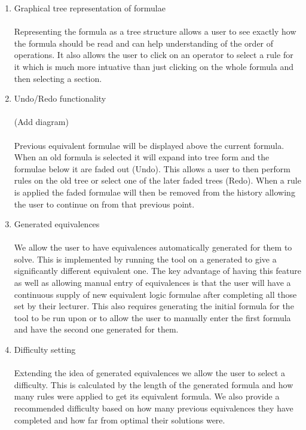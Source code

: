 \documentclass{report}
\begin{document}
\begin{enumerate}
\item Graphical tree representation of formulae
\\\\Representing the formula as a tree structure allows a user to see exactly how the formula should be read and can help understanding of the order of operations. It also allows the user to click on an operator to select a rule for it which is much more intuative than just clicking on the whole formula and then selecting a section.

\item Undo/Redo functionality
\\\\(Add diagram)
\\\\Previous equivalent formulae will be displayed above the current formula. When an old formula is selected it will expand into tree form and the formulae below it are faded out (Undo). This allows a user to then perform rules on the old tree or select one of the later faded trees (Redo). When a rule is applied the faded formulae will then be removed from the history allowing the user to continue on from that previous point.

\item Generated equivalences
\\\\We allow the user to have equivalences automatically generated for them to solve. This is implemented by running the tool on a generated to give a significantly different equivalent one. The key advantage of having this feature as well as allowing manual entry of equivalences is that the user will have a continuous supply of new equivalent logic formulae after completing all those set by their lecturer. This also requires generating the initial formula for the tool to be run upon or to allow the user to manually enter the first formula and have the second one generated for them.

\item Difficulty setting
\\\\Extending the idea of generated equivalences we allow the user to select a difficulty. This is calculated by the length of the generated formula and how many rules were applied to get its equivalent formula. We also provide a recommended difficulty based on how many previous equivalences they have completed and how far from optimal their solutions were.


\end{enumerate}
\end{document}
